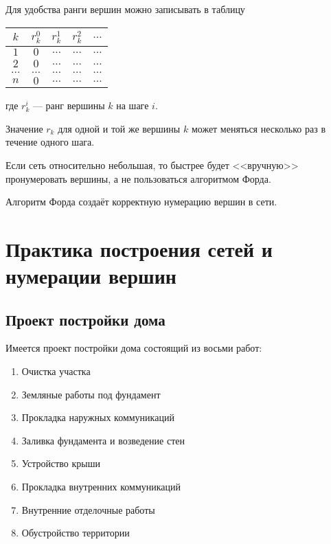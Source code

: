 Для удобства ранги вершин можно записывать в таблицу

\begin{table}[H]
	\centering
	\begin{tabular}{ | c | c | c | c | c | } 
		\hline
		$k$ & $r_k^0$ & $r_k^1$ & $r_k^2$ & $\dots$ \\\hline
		$1$ & $0$ & $\dots$ & $\dots$ & $\dots$ \\\hline
		$2$ & $0$ & $\dots$ & $\dots$ & $\dots$ \\\hline
		$\dots$ & $\dots$ & $\dots$ & $\dots$ & $\dots$ \\\hline
		$n$ & $0$ & $\dots$ & $\dots$ & $\dots$ \\\hline
	\end{tabular}
\end{table}

где $r_k^i$ --- ранг вершины $k$ на шаге $i$.

\remark

Значение $r_k$ для одной и той же вершины $k$ может меняться несколько раз в течение одного шага.

\remark

Если сеть относительно небольшая, то быстрее будет <<вручную>> пронумеровать вершины, а не пользоваться алгоритмом Форда.

\fact

Алгоритм Форда создаёт корректную нумерацию вершин в сети.

\section{Практика построения сетей и нумерации вершин}

\subsection{Проект постройки дома}\label{proj:house_building_project}


Имеется проект постройки дома состоящий из восьми работ:

\bigskip

\begin{enumerate}[nosep]
	\item Очистка участка
	\item Земляные работы под фундамент
	\item Прокладка наружных коммуникаций
	\item Заливка фундамента и возведение стен
	\item Устройство крыши
	\item Прокладка внутренних коммуникаций
	\item Внутренние отделочные работы
	\item Обустройство территории
\end{enumerate}

